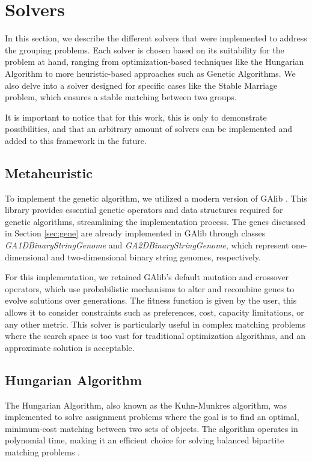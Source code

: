     \section{Solvers}
    \label{sec:solvers}
    In this section, we describe the different solvers that were implemented to address the grouping problems. Each solver is chosen based on its suitability for the problem at hand, ranging from optimization-based techniques like the Hungarian Algorithm to more heuristic-based approaches such as Genetic Algorithms. We also delve into a solver designed for specific cases like the Stable Marriage problem, which ensures a stable matching between two groups.

    It is important to notice that for this work, this is only to demonstrate possibilities, and that an arbitrary amount of solvers can be implemented and added to this framework in the future.
    
    \subsection{Metaheuristic}
    To implement the genetic algorithm, we utilized a modern version of GAlib \cite{galib}. This library provides essential genetic operators and data structures required for genetic algorithms, streamlining the implementation process. The genes discussed in Section \ref{sec:gene} are already implemented in GAlib through classes \textit{GA1DBinaryStringGenome} and \textit{GA2DBinaryStringGenome}, which represent one-dimensional and two-dimensional binary string genomes, respectively.
    
    For this implementation, we retained GAlib's default mutation and crossover operators, which use probabilistic mechanisms to alter and recombine genes to evolve solutions over generations. The fitness function is given by the user, this allows it to consider constraints such as preferences, cost, capacity limitations, or any other metric. This solver is particularly useful in complex matching problems where the search space is too vast for traditional optimization algorithms, and an approximate solution is acceptable.
    
    \subsection{Hungarian Algorithm}
    The Hungarian Algorithm, also known as the Kuhn-Munkres algorithm, was implemented to solve assignment problems where the goal is to find an optimal, minimum-cost matching between two sets of objects. The algorithm operates in polynomial time, making it an efficient choice for solving balanced bipartite matching problems \cite{kuhn1955hungarian}. 
    
